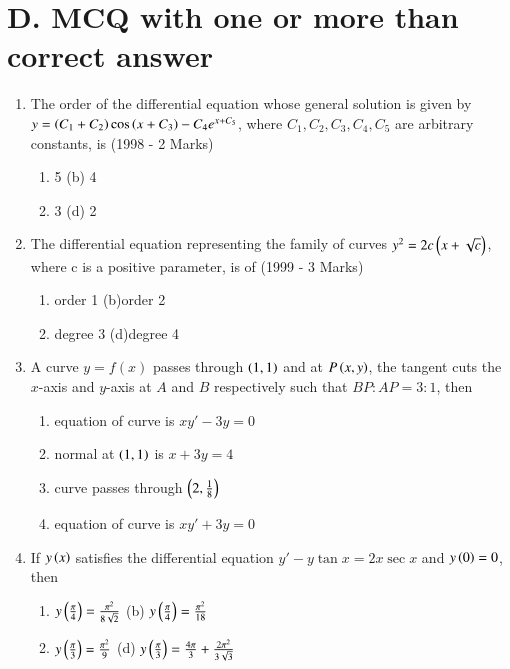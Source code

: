 \documentclass[journal,12pt,twocolumn]{IEEEtran}
\theoremstyle{remark}
\begin{document}
\section*{D. MCQ with one or more than correct answer}
\begin{enumerate}
    
\item The order of the differential equation whose general solution is given by
$y = \left(C_1 + C_2\right) \cos \left(x + C_3\right) - C_4 e^{x+C_5}$, where $C_1, C_2, C_3, C_4, C_5$ are arbitrary constants, is \hfill (1998 - 2 Marks)

\begin{enumerate}[label=(\alph*)]
    \item 5 \quad\quad\quad (b) 4
    \item 3 \quad\quad\quad (d) 2
\end{enumerate}


\item  The differential equation representing the family of curves
$y^2 = 2c \left(x + \sqrt{c}\right)$, where c  is a positive parameter, is of \hfill(1999 - 3 Marks)
\begin{enumerate}[label=(\alph*)]
    \item order 1 \quad\quad  (b)order 2
    \item degree 3 \quad (d)degree 4
\end{enumerate}

\item  A curve $ y = f(x) $ passes through $ \left(1,1\right) $ and at $ P\left(x, y\right) $, the tangent cuts the $ x $-axis and $ y $-axis at $ A $ and $ B $ respectively such that $ BP : AP = 3 : 1 $, then
\begin{enumerate}[label=(\alph*)]
    \item equation of curve is $ xy' - 3y = 0 $
    \item normal at $ \left(1, 1\right) $ is $ x + 3y = 4 $
    \item curve passes through $ \left(2, \frac{1}{8}\right) $
    \item equation of curve is $xy' + 3y = 0 $
\end{enumerate}

\item  If $y\left(x\right)$ satisfies the differential equation $y' - y \tan x = 2x \sec x $ and $y\left(0\right) = 0 $, then
\begin{enumerate}[label=(\alph*)]
    \item $ y\left(\frac{\pi}{4}\right) = \frac{\pi^2}{8\sqrt{2}} $ \quad (b) $ y\left(\frac{\pi}{4}\right) = \frac{\pi^2}{18} $
    \item $ y\left(\frac{\pi}{3}\right) = \frac{\pi^2}{9} $ \quad \quad (d) $ y\left(\frac{\pi}{3}\right) = \frac{4\pi}{3} + \frac{2\pi^2}{3\sqrt{3}} $
\end{enumerate}


\end{enumerate}
\end{document}

